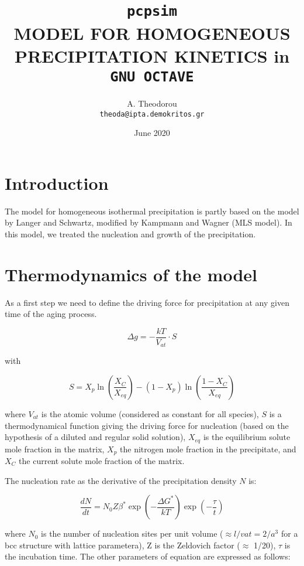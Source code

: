 \documentclass[12pt,a4paper]{article}
\author{
  A. Theodorou\\
  \texttt{theoda@ipta.demokritos.gr}

}
\date{June 2020}
\title{\texttt{pcpsim} \\ 
MODEL FOR HOMOGENEOUS PRECIPITATION KINETICS in \texttt{GNU OCTAVE}
}
\begin{document}
\maketitle

\section{Introduction}
The model for homogeneous isothermal precipitation is partly based on the model by Langer and Schwartz, modified by Kampmann and Wagner (MLS model). In this model, we treated the nucleation and growth of the precipitation.


\section{Thermodynamics of the model}

As a first step we need to define the driving force for precipitation at any given time of the aging process.
 
\begin{equation}
\Delta g = - \frac{kT}{V_{at}} \cdot S 
\end{equation}

with

\begin{equation}
S =  X_p \ln(\frac{X_C}{X_{eq}} ) - (1 - X_p) \ln(\frac{1 - X_C}{X_{eq}}) 
\end{equation}

where $V_{at}$ is the atomic volume (considered as constant for all species), $S$ is a thermodynamical  function giving the driving force for nucleation (based
on the hypothesis of a diluted and regular solid solution), $X_{eq}$ is the equilibrium solute mole fraction in the matrix, $X_p$ the nitrogen mole fraction in the precipitate, and $X_C$ the current solute mole fraction of the matrix.

The nucleation rate as the derivative of the precipitation density $N$ is:

\begin{equation}
\frac{d N}{d t} = N_0 Z \beta^* \exp(-\frac{\Delta G^*}{kT}) \exp(-\frac{\tau}{t})
\end{equation}

where $N_0$ is the number of nucleation sites per unit volume ($\approx  l/vat =2/a^3$ for a bcc structure with lattice parametera), Z is the Zeldovich factor ($\approx$ 1/20), $\tau$ is the incubation time. The other parameters of equation are expressed as follows:
\end{document}
